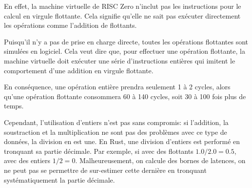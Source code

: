 \documentclass[12pt]{report}
\begin{document}
En effet, la machine virtuelle de RISC Zero n'inclut pas les
instructions pour le calcul en virgule flottante. Cela signifie
qu'elle ne sait pas exécuter directement les opérations
comme l'addition de flottants.

\medskip

Puisqu'il n'y a pas de prise en charge directe, toutes les opérations
flottantes sont simulées en logiciel. Cela veut dire que, pour effectuer
une opération flottante, la machine virtuelle doit exécuter
une série d'instructions entières qui imitent le comportement d'une addition
en virgule flottante.

\medskip

En conséquence, une opération entière prendra seulement 1 à 2
cycles, alors qu'une opération flottante consommera 60 à 140 cycles,
soit 30 à 100 fois plus de temps.

\medskip

\begin{figure}[h!]
\centering
{}
\end{figure}

\medskip

Cependant, l'utilisation d'entiers n'est pas sans compromis:
si l'addition, la soustraction et la multiplication ne sont pas 
des problèmes avec ce type de données, la division en est une.
En Rust, une division d'entiers est performé en tronquant sa partie
décimale. Par exemple, si avec des flottants $1.0/2.0 = 0.5$,
avec des entiers $1/2 = 0$. Malheureusement, on calcule des bornes de
latences, on ne peut pas se permettre de sur-estimer cette dernière
en tronquant systématiquement la partie décimale.
\end{document}
